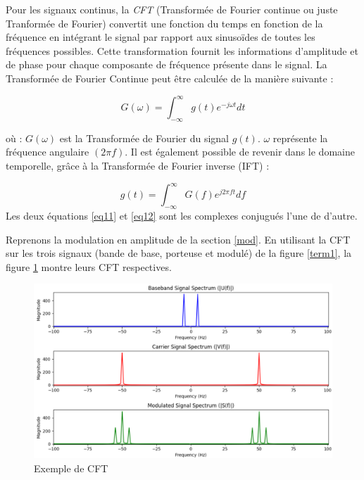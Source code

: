 \vspace{0.1cm}

Pour les signaux continus, la \textit{CFT} (Transformée de Fourier continue ou juste Tranformée de Fourier) convertit une fonction du temps en fonction de la fréquence en intégrant le signal par rapport aux sinusoïdes de toutes les fréquences possibles. Cette transformation fournit les informations d'amplitude et de phase pour chaque composante de fréquence présente dans le signal. La Transformée de Fourier Continue peut être calculée de la manière suivante :  

\begin{equation}\label{eq11}
G(\omega) = \int_{-\infty}^{\infty} g(t)e^{-j\omega t} dt
\end{equation}

où : $G(\omega)$ est la Transformée de Fourier du signal $g(t)$. $\omega$ représente la fréquence angulaire $(2 \pi f)$.
Il est également possible de revenir dans le domaine temporelle, grâce à la Transformée de Fourier inverse (IFT) :

\begin{equation}\label{eq12}
g(t) = \int_{-\infty}^{\infty} G(f)e^{j2\pi ft} df
\end{equation}
Les deux équations \ref{eq11} et \ref{eq12} sont les complexes conjugués l'une de d'autre.

\vspace{0.1cm}

Reprenons la modulation en amplitude de la section \ref{mod}. En utilisant la CFT sur les trois signaux (bande de base, porteuse et modulé) de la figure \ref{term1}, la figure \ref{term8} montre leurs CFT respectives.

\begin{figure}[h]
\centering

\includegraphics[scale=0.5]{images/CFT.PNG}
\caption{Exemple de CFT}\label{term8}
\end{figure}

